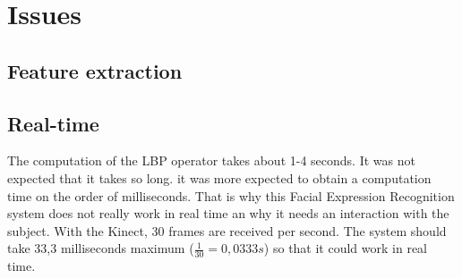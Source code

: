 \chapter{Issues}
\label{chap:eval_issues}

\section{Feature extraction}

\vspace{\baselineskip}
\noindent 
\newline

\section{Real-time}

\vspace{\baselineskip}
\noindent The computation of the LBP operator takes about 1-4 seconds. It was not expected that it takes so long. it was more expected to obtain a computation time on the order of milliseconds. That is why this Facial Expression Recognition system does not really work in real time an why it needs an interaction with the subject. With the Kinect, 30 frames are received per second. The system should take 33,3 milliseconds maximum ($ \frac{1}{30} = 0,0333 s $) so that it could work in real time.
\newline
